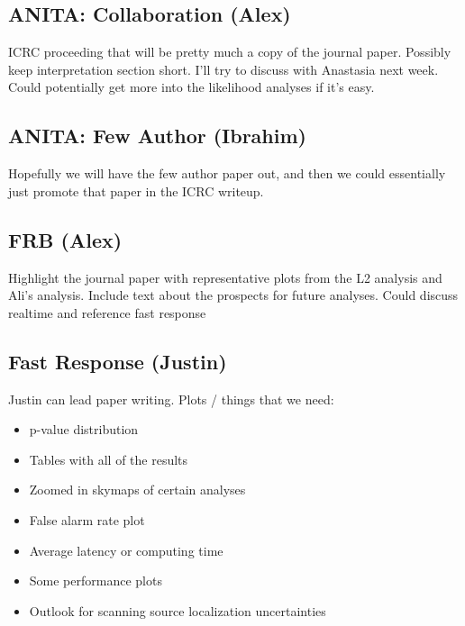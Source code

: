 \subsection{ANITA: Collaboration (Alex)}
ICRC proceeding that will be pretty much a copy of the journal paper. Possibly keep interpretation section short. I'll try to discuss with Anastasia next week. Could potentially get more into the likelihood analyses if it's easy. 

\subsection{ANITA: Few Author (Ibrahim)}
Hopefully we will have the few author paper out, and then we could essentially just promote that paper in the ICRC writeup. 

\subsection{FRB (Alex)}
Highlight the journal paper with representative plots from the L2 analysis and Ali's analysis. Include text about the prospects for future analyses. Could discuss realtime and reference fast response 

\subsection{Fast Response (Justin)}
Justin can lead paper writing. Plots / things that we need:
\begin{itemize}
    \itemsep-0.85em 
    \item p-value distribution
    \item Tables with all of the results
    \item Zoomed in skymaps of certain analyses
    \item False alarm rate plot
    \item Average latency or computing time
    \item Some performance plots
    \item Outlook for scanning source localization uncertainties
\end{itemize}

